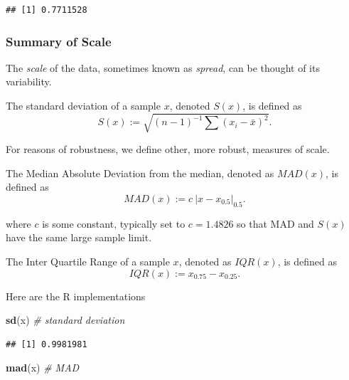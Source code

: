 \documentclass[]{book}
\newenvironment{Shaded}{\begin{snugshade}}{\end{snugshade}}
\newcommand{\CommentTok}[1]{\textcolor[rgb]{0.56,0.35,0.01}{\textit{#1}}}
\newcommand{\KeywordTok}[1]{\textcolor[rgb]{0.13,0.29,0.53}{\textbf{#1}}}
\newcommand{\NormalTok}[1]{#1}
\theoremstyle{definition}
\theoremstyle{definition}
\theoremstyle{definition}
\theoremstyle{remark}
\let\BeginKnitrBlock\begin \let\EndKnitrBlock\end
\begin{document}
\begin{verbatim}
## [1] 0.7711528
\end{verbatim}

\hypertarget{summary-of-scale}{%
\subsubsection{Summary of Scale}\label{summary-of-scale}}

The \emph{scale} of the data, sometimes known as \emph{spread}, can be thought of its variability.

\BeginKnitrBlock{definition}[Standard Deviation]
\protect\hypertarget{def:unnamed-chunk-118}{}{\label{def:unnamed-chunk-118} {} }The standard deviation of a sample \(x\), denoted \(S(x)\), is defined as
\[ S(x):=\sqrt{(n-1)^{-1} \sum (x_i-\bar x)^2} . \]
\EndKnitrBlock{definition}

For reasons of robustness, we define other, more robust, measures of scale.

\BeginKnitrBlock{definition}[MAD]
\protect\hypertarget{def:unnamed-chunk-119}{}{\label{def:unnamed-chunk-119} {} }The Median Absolute Deviation from the median, denoted as \(MAD(x)\), is defined as
\[MAD(x):= c \: |x-x_{0.5}|_{0.5} . \]
\EndKnitrBlock{definition}

where \(c\) is some constant, typically set to \(c=1.4826\) so that MAD and \(S(x)\) have the same large sample limit.

\BeginKnitrBlock{definition}[IQR]
\protect\hypertarget{def:unnamed-chunk-120}{}{\label{def:unnamed-chunk-120} {} }The Inter Quartile Range of a sample \(x\), denoted as \(IQR(x)\), is defined as
\[ IQR(x):= x_{0.75}-x_{0.25} .\]
\EndKnitrBlock{definition}

Here are the R implementations

\begin{Shaded}
\begin{Highlighting}[]
\KeywordTok{sd}\NormalTok{(x) }\CommentTok{# standard deviation}
\end{Highlighting}
\end{Shaded}

\begin{verbatim}
## [1] 0.9981981
\end{verbatim}

\begin{Shaded}
\begin{Highlighting}[]
\KeywordTok{mad}\NormalTok{(x) }\CommentTok{# MAD}
\end{Highlighting}
\end{Shaded}
\end{document}

